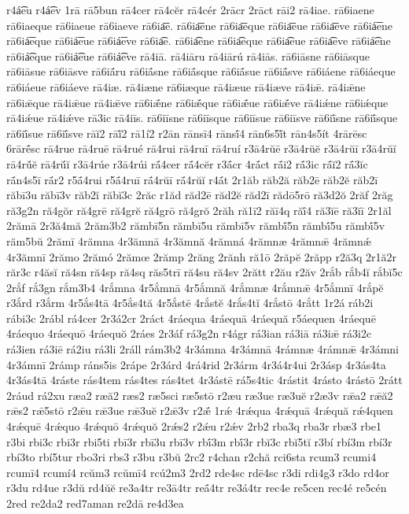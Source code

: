 {r4á͡eu
r4á͡ev
1rā
rā5bun
rā4cer
rā4cĕr
rā4cér
2rācr
2rāct
rāi2
rā4iae.
rā6iaene
rā6iaeque
rā6iaeue
rā6iaeve
rā6ia͞e.
rā6ia͞ene
rā6ia͞eque
rā6ia͞eue
rā6ia͞eve
rā6iá͞ene
rā6iá͞eque
rā6iá͞eue
rā6iá͞eve
rā6ia͡e.
rā6ia͡ene
rā6ia͡eque
rā6ia͡eue
rā6ia͡eve
rā6iá͡ene
rā6iá͡eque
rā6iá͡eue
rā6iá͡eve
rā4iā.
rā4iāru
rā4iārú
rā4iās.
rā6iāsne
rā6iāsque
rā6iāsue
rā6iāsve
rā6iā́ru
rā6iā́sne
rā6iā́sque
rā6iā́sue
rā6iā́sve
rā6iáene
rā6iáeque
rā6iáeue
rā6iáeve
rā4iæ.
rā4iæne
rā6iæque
rā4iæue
rā4iæve
rā4iǣ.
rā4iǣne
rā6iǣque
rā4iǣue
rā4iǣve
rā6iǣ́ne
rā6iǣ́que
rā6iǣ́ue
rā6iǣ́ve
rā4iǽne
rā6iǽque
rā4iǽue
rā4iǽve
rā3ic
rā4iīs.
rā6iīsne
rā6iīsque
rā6iīsue
rā6iīsve
rā6iī́sne
rā6iī́sque
rā6iī́sue
rā6iī́sve
rāĭ2
rāĭ́2
rā1í2
r2ān
rānsī4
rānsī́4
rān6s5ĭ́t
rān4s5ít
4rārēsc
6rārḗsc
rā4rue
rā4ruē
rā4rué
rā4rui
rā4ruī
rā4ruí
r3ā4rŭē
r3ā4rŭĕ
r3ā4rŭī
r3ā4rŭĭ
rā4rŭ́ĕ
rā4rŭ́ĭ
r3ā4rúe
r3ā4rúi
rā́4cer
rā́4cĕr
r3ā́cr
4rā́ct
rā́i2
rā́3ic
rā́ĭ2
rā́3ĭc
rā́n4s5ī
rā́r2
r5ā́4rui
r5ā́4ruī
rā́4rŭī
rā́4rŭĭ
r4ā́t
2r1ăb
răb2ă
răb2ē
răb2ĕ
răb2ī
răbī3u
răbī3v
răb2ĭ
răbĭ3c
2răc
r1ăd
răd2ē
răd2ĕ
răd2ī
rădō5rō
ră3d2ŏ
2răf
2răg
ră3g2n
ră4gŏr
ră4grē
ră4grĕ
ră4grō
ră4grŏ
2răh
ră1ī2
răī4q
răī́4
ră3ĭē
ră3ĭī
2r1ăl
2rămā
2r3ă4mă
2răm3b2
rămbī5n
rămbī5u
rămbī5v
rămbī́5n
rămbī́5u
rămbī́5v
răm5bŭ
2rămī
4rămna
4r3ămnā
4r3ămnă
4rămná
4rămnæ
4rămnǣ
4rămnǽ
4r3ămnī
2rămo
2rămó
2rămœ
2rămp
2răng
2rănh
ră1ō
2răpĕ
2răpp
r2ă3q
2r1ă2r
răr3c
r4ăsĭ
ră4sn
ră4sp
ră4sq
răs5trī
ră4su
ră4sv
2rătt
r2ău
r2ăv
2rắb
rắb4ĭ
rắbĭ5c
2rắf
rắ3gn
rắm3b4
4rắmna
4r5ắmnā
4r5ắmnă
4rắmnæ
4rắmnǣ
4r5ắmnī
4rắpĕ
r3ắrd
r3ắrm
4r5ắs4tā
4r5ắs4tă
4r5ắstē
4rắstĕ
4rắs4tĭ
4rắstō
4rắtt
1r2á
ráb2i
rábi3c
2rábl
rá4cer
2r3á2cr
2ráct
4ráequa
4ráequā
4ráequă
r5áequen
4ráequē
4ráequo
4ráequō
4ráequŏ
2ráes
2r3áf
rá3g2n
r4ágr
rá3ian
rá3iā
rá3iǣ
rá3i2c
rá3ien
rá3iē
rá2iu
rá3li
2ráll
rám3b2
4r3ámna
4r3ámnā
4rámnæ
4rámnǣ
4r3ámni
4r3ámnī
2rámp
ráns5is
2rápe
2r3árd
4rá4rid
2r3árm
4r3á4r4ui
2r3ásp
4r3ás4ta
4r3ás4tā
4ráste
rás4tem
rás4tes
rás4tet
4r3ástē
rá5s4tic
4rástit
4rásto
4rástō
2rátt
2ráud
rá2xu
ræa2
ræă2
ræs2
ræ5sci
ræ5stō
r2æu
ræ3ue
ræ3uĕ
r2æ3v
rǣa2
rǣă2
rǣs2
rǣ5stō
r2ǣu
rǣ3ue
rǣ3uĕ
r2ǣ3v
r2ǣ́
1rǽ
4rǽqua
4rǽquā
4rǽquă
rǽ4quen
4rǽquē
4rǽquo
4rǽquō
4rǽquŏ
2rǽs2
r2ǽu
r2ǽv
2rb2
rba3q
rba3r
rbæ3
rbe1
r3bi
rbi3c
rbi3r
rbi5ti
rbī3r
rbī3u
rbī3v
rbī́3m
rbī́3r
rbĭ3c
rbĭ5tĭ
r3bí
rbí3m
rbí3r
rbí3to
rbí5tur
rbo3ri
rbs3
r3bu
r3bŭ
2rc2
r4chan
r2chă
rci6sta
rcum3
rcumi4
rcumī4
rcumí4
rcŭm3
rcŭmī4
rcú2m3
2rd2
rde4sc
rdē4sc
r3di
rdi4g3
r3do
rd4or
r3du
rd4ue
r3dŭ
rd4ŭĕ
re3a4tr
re3ā4tr
reā́4tr
re3á4tr
rec4e
re5cen
rec4é
re5cén
2red
re2da2
red7aman
re2dā
re4d3ea
}
